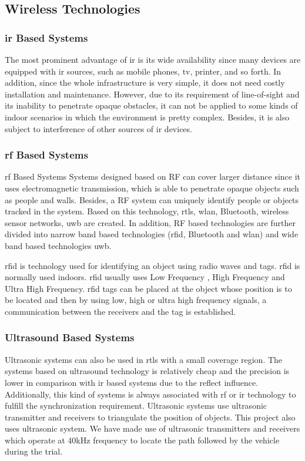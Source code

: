 \subsection{Wireless Technologies}

\subsubsection{\gls{ir} Based Systems}
The most prominent advantage of \gls{ir} is its wide availability since many devices are equipped with \gls{ir} sources, such as mobile phones, \gls{tv}, printer, and so forth. In addition, since the whole infrastructure is very simple, it does not need costly installation and maintenance. However, due to its requirement of line-of-sight and its inability to penetrate
opaque obstacles, it can not be applied to some kinds of indoor scenarios in which the environment is pretty complex. Besides, it is also subject to interference of other sources of \gls{ir} devices.

\subsubsection{\gls{rf} Based Systems}
\gls{rf} Based Systems Systems designed based on RF can cover larger distance since it uses electromagnetic transmission, which is able to penetrate opaque objects such as people and walls. Besides, a RF system can uniquely identify people or objects tracked in the system. Based on this technology, \gls{rtls}, \gls{wlan}, Bluetooth, wireless sensor networks, \gls{uwb} are created. In addition, RF based technologies are further divided into narrow band based technologies (\gls{rfid}, Bluetooth and \gls{wlan}) and wide band based technologies \gls{uwb}.

\gls{rfid} is technology used for identifying an object using radio waves and tags. \gls{rfid} is normally used indoors. \gls{rfid} usually uses Low Frequency , High Frequency and Ultra High Frequency. \gls{rfid} tags can be placed at the object whose position is to be located and then by using low, high or ultra high frequency signals, a communication between the receivers and the tag is established.



\subsubsection{Ultrasound Based Systems}
Ultrasonic systems can also be used in \gls{rtls} with a small coverage region. The systems based on ultrasound technology is relatively cheap and the precision is lower in comparison with \gls{ir} based systems due to the reflect influence. Additionally, this kind of systems is always associated with \gls{rf} or \gls{ir} technology to fulfill the synchronization requirement. Ultrasonic systems use ultrasonic transmitter and receivers to triangulate the position of objects. This project also uses ultrasonic system. We have made use of ultrasonic transmitters and receivers which operate at 40kHz frequency to locate the path followed by the vehicle during the trial.


